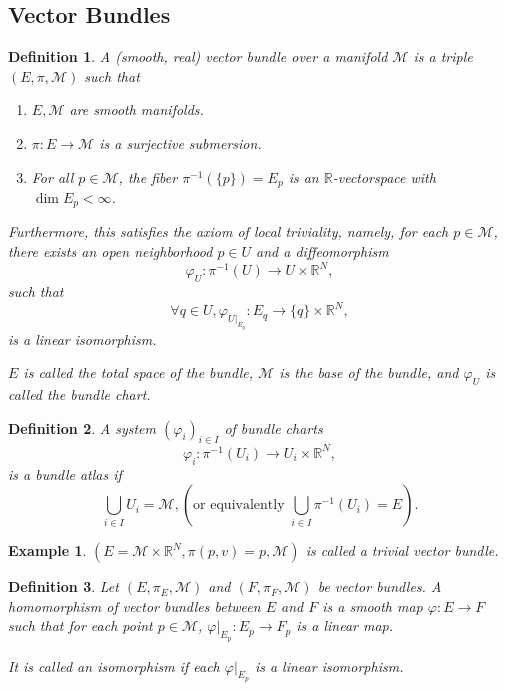 \documentclass[10pt]{article}
\newtheorem{definition}{Definition}[section]
\newtheorem{example}{Example}[section]
\newcommand{\R}[0]{\mathbb{R}}
\newcommand{\M}[0]{\mathcal{M}}
\begin{document}
\subsection{Vector Bundles}
\begin{definition}
  A (smooth, real) vector bundle over a manifold $\M$ is a triple $(E,\pi,\M)$ such that 
  \begin{enumerate}[1).]
    \item $E,\M$ are smooth manifolds. 
    \item $\pi:E\to \M$ is a surjective submersion.
    \item For all $p\in\M$, the fiber $\pi^{-1}(\{p\}) = E_p$ is an $\R$-vectorspace with $\dim E_p<\infty$.
  \end{enumerate}
  Furthermore, this satisfies the axiom of local triviality, namely, for each $p\in\M$, there exists an open neighborhood $p\in U$ and a diffeomorphism 
  \begin{equation*}
    \varphi_U:\pi^{-1}(U)\to U\times \R^N,
  \end{equation*}
  such that 
  \begin{equation*}
    \forall q\in U, \varphi_{U|_{E_q}}:E_q\to\{q\}\times \R^N,
  \end{equation*}
  is a linear isomorphism.
  \par $E$ is called the total space of the bundle, $\M$ is the base of the bundle, and $\varphi_U$ is called the bundle chart.
\end{definition}
\begin{definition}
  A system $(\varphi_i)_{i\in I}$ of bundle charts 
  \begin{equation*}
    \varphi_i:\pi^{-1}(U_i)\to U_i\times \R^N,
  \end{equation*}
  is a bundle atlas if 
  \begin{equation*}
    \bigcup_{i\in I}U_i = \M, \left(\text{or equivalently } \bigcup_{i\in I}\pi^{-1}(U_i)=E\right).
  \end{equation*}
\end{definition}

\begin{example}
  $(E=\M\times\R^N,\pi(p,v) = p,\M)$ is called a trivial vector bundle.
\end{example}

\begin{definition}
  Let $(E,\pi_E,\M)$ and $(F,\pi_F,\M)$ be vector bundles. A homomorphism of vector bundles between $E$ and $F$ is a smooth map 
  $\varphi:E\to F$ such that for each point $p\in\M$, $\varphi|_{E_p}:E_p\to F_p$ is a linear map.
  \par It is called an isomorphism if each $\varphi|_{E_p}$ is a linear isomorphism.
\end{definition}
\end{document}
